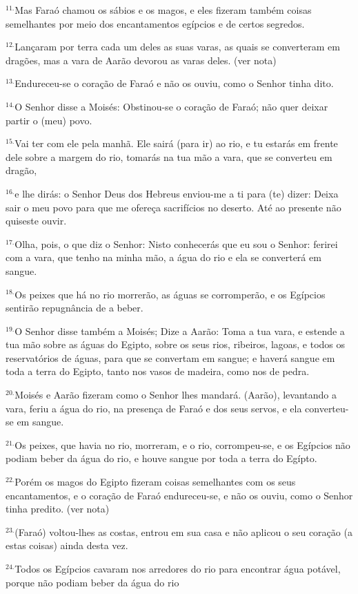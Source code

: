 \documentclass[a4paper,14pt]{extarticle} \usepackage[utf8]{inputenc}
\begin{document}
$^{11.}$Mas Faraó chamou os sábios e os magos, e eles fizeram também coisas semelhantes por meio dos encantamentos egípcios e de certos segredos.

$^{12.}$Lançaram por terra cada um deles as suas varas, as quais se converteram em dragões, mas a vara de Aarão devorou as varas deles. (ver nota)

$^{13.}$Endureceu-se o coração de Faraó e não os ouviu, como o Senhor tinha dito.

$^{14.}$O Senhor disse a Moisés: Obstinou-se o coração de Faraó; não quer deixar partir o (meu) povo.

$^{15.}$Vai ter com ele pela manhã. Ele sairá (para ir) ao rio, e tu estarás em frente dele sobre a margem do rio, tomarás na tua mão a vara, que se converteu em dragão,

$^{16.}$e lhe dirás: o Senhor Deus dos Hebreus enviou-me a ti para (te) dizer: Deixa sair o meu povo para que me ofereça sacrifícios no deserto. Até ao presente não quiseste ouvir.

$^{17.}$Olha, pois, o que diz o Senhor: Nisto conhecerás que eu sou o Senhor: ferirei com a vara, que tenho na minha mão, a água do rio e ela se converterá em sangue.

$^{18.}$Os peixes que há no rio morrerão, as águas se corromperão, e os Egípcios sentirão repugnância de a beber.

$^{19.}$O Senhor disse também a Moisés; Dize a Aarão: Toma a tua vara, e estende a tua mão sobre as águas do Egipto, sobre os seus rios, ribeiros, lagoas, e todos os reservatórios de águas, para que se convertam em sangue; e haverá sangue em toda a terra do Egipto, tanto nos vasos de madeira, como nos de pedra.

$^{20.}$Moisés e Aarão fizeram como o Senhor lhes mandará. (Aarão), levantando a vara, feriu a água do rio, na presença de Faraó e dos seus servos, e ela converteu-se em sangue.

$^{21.}$Os peixes, que havia no rio, morreram, e o rio, corrompeu-se, e os Egípcios não podiam beber da água do rio, e houve sangue por toda a terra do Egípto.

$^{22.}$Porém os magos do Egipto fizeram coisas semelhantes com os seus encantamentos, e o coração de Faraó endureceu-se, e não os ouviu, como o Senhor tinha predito. (ver nota)

$^{23.}$(Faraó) voltou-lhes as costas, entrou em sua casa e não aplicou o seu coração (a estas coisas) ainda desta vez.

$^{24.}$Todos os Egípcios cavaram nos arredores do rio para encontrar água potável, porque não podiam beber da água do rio
\end{document}
